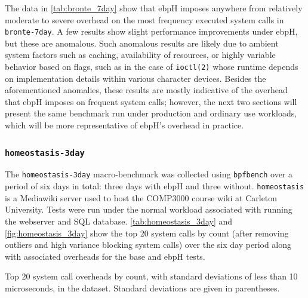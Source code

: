 \documentclass[
  12pt]{findlay}
\newcommand{\passthrough}[1]{#1}
\begin{document}
The data in \autoref{tab:bronte_7day} show that ebpH imposes anywhere
from relatively moderate to severe overhead on the most frequency
executed system calls in \passthrough{\lstinline!bronte-7day!}. A few
results show slight performance improvements under ebpH, but these are
anomalous. Such anomalous results are likely due to ambient system
factors such as caching, availability of resources, or highly variable
behavior based on flags, such as in the case of
\passthrough{\lstinline!ioctl(2)!} whose runtime depends on
implementation details within various character devices. Besides the
aforementioned anomalies, these results are mostly indicative of the
overhead that ebpH imposes on frequent system calls; however, the next
two sections will present the same benchmark run under production and
ordinary use workloads, which will be more representative of ebpH's
overhead in practice.

\FloatBarrier

\hypertarget{homeostasis-3day}{%
\subsubsection{\texorpdfstring{\texttt{homeostasis-3day}}{homeostasis-3day}}\label{homeostasis-3day}}

\label{homeostasis_3day}

The \passthrough{\lstinline!homeostasis-3day!} macro-benchmark was
collected using \passthrough{\lstinline!bpfbench!} over a period of six
days in total: three days with ebpH and three without.
\passthrough{\lstinline!homeostasis!} is a Mediawiki server used to host
the COMP3000 course wiki at Carleton University. Tests were run under
the normal workload associated with running the webserver and SQL
database. \autoref{tab:homeostasis_3day} and
\autoref{fig:homeostasis_3day} show the top 20 system calls by count
(after removing outliers and high variance blocking system calls) over
the six day period along with associated overheads for the base and ebpH
tests.

\begin{table}
    \caption[Top 20 system call overheads by count in the  dataset]{
        Top 20 system call overheads by count, with standard deviations of less than 10 microseconds,
        in the  dataset.
        Standard deviations are given in parentheses.
    }
    \label{tab:homeostasis_3day}
    \resizebox{\columnwidth}{!}{
    
    }
\end{table}
\end{document}
